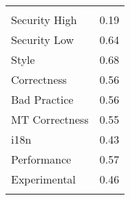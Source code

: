
\begin{tabular}{lc}
\hline \\
Security High & 0.19\\
Security Low & 0.64\\
Style & 0.68\\
Correctness & 0.56\\
Bad Practice & 0.56\\
MT Correctness & 0.55\\
i18n & 0.43\\
Performance & 0.57\\
Experimental & 0.46\\
\hline \\
\end{tabular}
